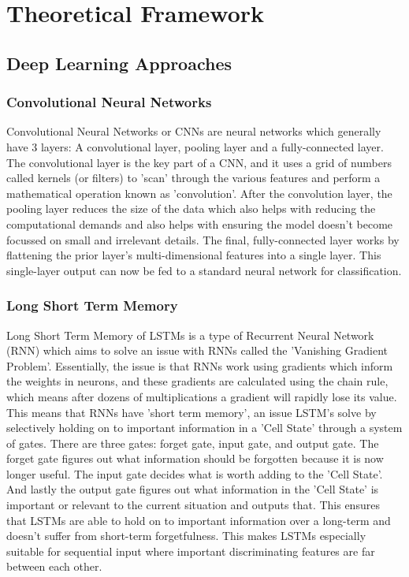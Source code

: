 \documentclass[stu,12pt,floatsintext,donotrepeattitle]{apa7}
\begin{document}
\clearpage
\section{Theoretical Framework}


\subsection{Deep Learning Approaches}

\subsubsection{Convolutional Neural Networks}
Convolutional Neural Networks or CNNs are neural networks which generally have 3 layers: A convolutional layer, pooling layer and a fully-connected layer. The convolutional layer is the key part of a CNN, and it uses a grid of numbers called kernels (or filters) to 'scan' through the various features and perform a mathematical operation known as 'convolution'. After the convolution layer, the pooling layer reduces the size of the data which also helps with reducing the computational demands and also helps with ensuring the model doesn't become focussed on small and irrelevant details. The final, fully-connected layer works by flattening the prior layer's multi-dimensional features into a single layer. This single-layer output can now be fed to a standard neural network for classification.

\subsubsection{Long Short Term Memory}
Long Short Term Memory of LSTMs is a type of Recurrent Neural Network (RNN) which aims to solve an issue with RNNs called the 'Vanishing Gradient Problem'. Essentially, the issue is that RNNs work using gradients which inform the weights in neurons, and these gradients are calculated using the chain rule, which means after dozens of multiplications a gradient will rapidly lose its value. This means that RNNs have 'short term memory', an issue LSTM's solve by selectively holding on to important information in a 'Cell State' through a system of gates. There are three gates: forget gate, input gate, and output gate. The forget gate figures out what information should be forgotten because it is now longer useful. The input gate decides what is worth adding to the 'Cell State'. And lastly the output gate figures out what information in the 'Cell State' is important or relevant to the current situation and outputs that. This ensures that LSTMs are able to hold on to important information over a long-term and doesn't suffer from short-term forgetfulness. This makes LSTMs especially suitable for sequential input where important discriminating features are far between each other. 
\end{document}
